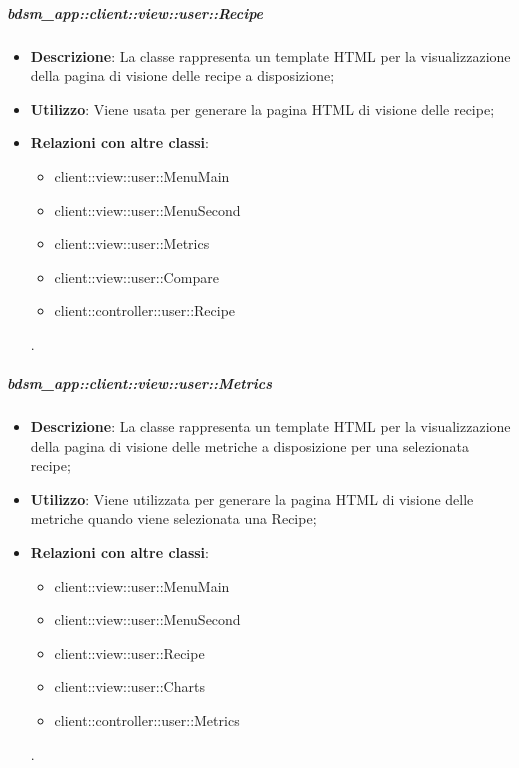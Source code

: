 		\subparagraph{bdsm\_app::client::view::user::Recipe} %
		\label{subp:bdsm_app_client_view_user_recipe}
			\begin{itemize}
				\item \textbf{Descrizione}: La classe rappresenta un template HTML per la visualizzazione della pagina di visione delle recipe a disposizione;
				\item \textbf{Utilizzo}: Viene usata per generare la pagina HTML di visione delle recipe;
				\item \textbf{Relazioni con altre classi}: 		
					\begin{itemize}
						\item client::view::user::MenuMain
						\item client::view::user::MenuSecond
						\item client::view::user::Metrics
						\item client::view::user::Compare
						\item client::controller::user::Recipe
					\end{itemize}.
			\end{itemize}

		\subparagraph{bdsm\_app::client::view::user::Metrics} %
		\label{subp:bdsm_app_client_view_metrics}
			\begin{itemize}
				\item \textbf{Descrizione}: La classe rappresenta un template HTML per la visualizzazione della pagina di visione delle metriche a disposizione per una selezionata recipe;
				\item \textbf{Utilizzo}: Viene utilizzata per generare la pagina HTML di visione delle metriche quando viene selezionata una Recipe;
				\item \textbf{Relazioni con altre classi}: 		
					\begin{itemize}
						\item client::view::user::MenuMain
						\item client::view::user::MenuSecond
						\item client::view::user::Recipe
						\item client::view::user::Charts
						\item client::controller::user::Metrics
					\end{itemize}.
			\end{itemize}

